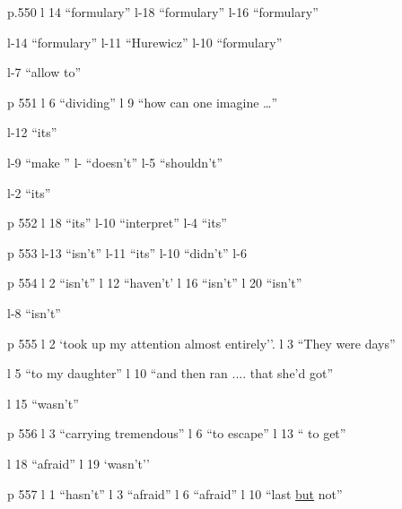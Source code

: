 
p.550 l 14 ``formulary'' \quad l-18 ``formulary'' \quad l-16 ``formulary''

l-14 ``formulary'' \quad l-11 ``Hurewicz'' \quad l-10 ``formulary''

l-7 ``allow  to''

p 551 l 6 ``dividing'' \quad l 9 ``how can one imagine \ldots''

l-12 ``its''

l-9 ``make '' \quad l- ``doesn't'' \quad l-5 ``shouldn't''

l-2 ``its''

p 552 l 18 ``its'' \quad l-10 ``interpret'' \quad l-4 ``its''

p 553 l-13 ``isn't'' \quad l-11 ``its'' \quad l-10 ``didn't'' \quad l-6

p 554 l 2 ``isn't'' \quad l 12 ``haven't' \quad l 16 ``isn't'' \quad l 20 ``isn't''

l-8 ``isn't''

p 555 l 2 `took up my attention almost entirely''. \quad l 3 ``They were days''

l 5 ``to my daughter'' \quad l 10 ``and then ran .... that she'd got''

l 15 ``wasn't''

p 556 l 3 ``carrying tremendous'' \quad l 6 ``to escape'' \quad l 13 `` to get''

l 18 ``afraid'' \quad l 19 `wasn't''

p 557 l 1 ``hasn't'' \quad l 3 ``afraid'' \quad l 6 ``afraid'' \quad l 10 ``last \uline{but} not''
